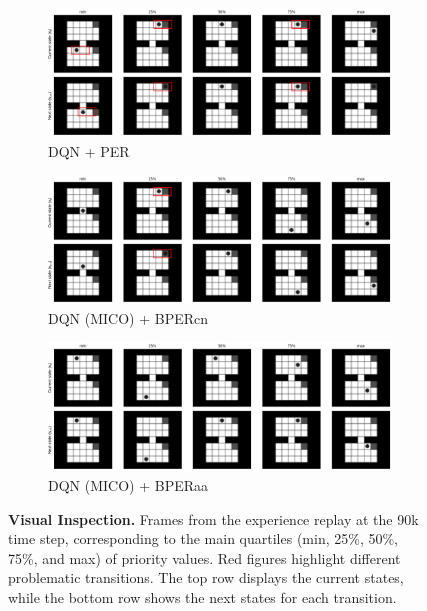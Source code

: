 \begin{figure}[p]
    \centering
    \begin{subfigure}{1.\textwidth}
    \includegraphics[width=\linewidth]{Results/grid_world/quartiles_images_per.png}
        \caption{DQN + PER}
        \label{fig:quartiles_per}
    \end{subfigure}
    \begin{subfigure}{1.\textwidth}
        \includegraphics[width=\linewidth]{Results/grid_world/quartiles_images_dqn_mico_bpercn.png}
        \caption{DQN (MICO) + BPERcn}
        \label{fig:quartiles_bpercn}
    \end{subfigure}
    \begin{subfigure}{1.\textwidth}
        \includegraphics[width=\linewidth]{Results/grid_world/quartiles_images_dqn_mico_bperaa.png}
        \caption{DQN (MICO) + BPERaa}
        \label{fig:quartiles_bperaa}
    \end{subfigure}
    \caption[Visual Inspection]{\textbf{Visual Inspection.} Frames from the experience replay at the 90k time step, corresponding to the main quartiles (min, 25\%, 50\%, 75\%, and max) of priority values. Red figures highlight different problematic transitions. The top row displays the current states, while the bottom row shows the next states for each transition.}
    \label{fig:quartiles_all_methods}
\end{figure}

